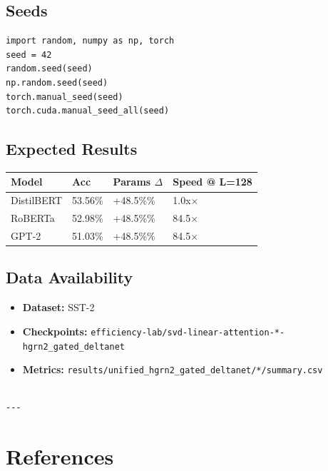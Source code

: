 \subsection{Seeds}

\begin{lstlisting}
import random, numpy as np, torch
seed = 42
random.seed(seed)
np.random.seed(seed)
torch.manual_seed(seed)
torch.cuda.manual_seed_all(seed)
\end{lstlisting}

\subsection{Expected Results}

\begin{table}[H]
\centering
\small
\begin{tabular}{llll}
\toprule
\textbf{Model} & \textbf{Acc} & \textbf{Params $\Delta$} & \textbf{Speed @ L=128} \\
\midrule
DistilBERT & 53.56\% & +48.5\%\% & 1.0x$\times$ \\
RoBERTa & 52.98\% & +48.5\%\% & 84.5$\times$ \\
GPT-2 & 51.03\% & +48.5\%\% & 84.5$\times$ \\
\bottomrule
\end{tabular}
\end{table}

\subsection{Data Availability}

\begin{itemize}
\item \textbf{Dataset:} SST-2
\item \textbf{Checkpoints:} \texttt{efficiency-lab/svd-linear-attention-*-hgrn2\_gated\_deltanet}
\item \textbf{Metrics:} \texttt{results/unified\_hgrn2\_gated\_deltanet/*/summary.csv}
\end{itemize}
\begin{lstlisting}

---
\end{lstlisting}

\section{References}

